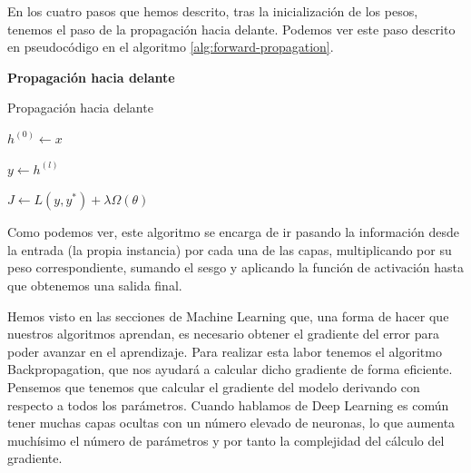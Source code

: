 En los cuatro pasos que hemos descrito, tras la inicialización de los pesos, tenemos el paso de la propagación hacia delante. Podemos ver este paso descrito en pseudocódigo en el algoritmo \ref{alg:forward-propagation}.

\begin{algorithm}[]{\Large{\textbf{Propagación hacia delante}}}
	
	\vspace{10px}
	
	\caption{Propagación hacia delante}
	\label{alg:forward-propagation}
	
	\vspace{10px}
	
	$h^{(0)}\leftarrow x$
	

	$y\leftarrow h^{(l)}$
	
	$J\leftarrow L(y,y^*) + \lambda \Omega (\theta)$
	
	\vspace{10px}
	
	
	\vspace{5px}
\end{algorithm}

Como podemos ver, este algoritmo se encarga de ir pasando la información desde la entrada (la propia instancia) por cada una de las capas, multiplicando por su peso correspondiente, sumando el sesgo y aplicando la función de activación hasta que obtenemos una salida final.

Hemos visto en las secciones de Machine Learning que, una forma de hacer que nuestros algoritmos aprendan, es necesario obtener el gradiente del error para poder avanzar en el aprendizaje. Para realizar esta labor tenemos el algoritmo Backpropagation, que nos ayudará a calcular dicho gradiente de forma eficiente. Pensemos que tenemos que calcular el gradiente del modelo derivando con respecto a todos los parámetros. Cuando hablamos de Deep Learning es común tener muchas capas ocultas con un número elevado de neuronas, lo que aumenta muchísimo el número de parámetros y por tanto la complejidad del cálculo del gradiente.

